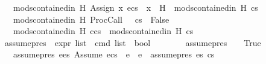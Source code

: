 \begin{isabellebody}
\ \ {\isacharbar}{\kern0pt}\ {\isachardoublequoteopen}mods{\isacharunderscore}{\kern0pt}contained{\isacharunderscore}{\kern0pt}in\ H\ {\isacharparenleft}{\kern0pt}{\isacharparenleft}{\kern0pt}Assign\ x\ e{\isacharparenright}{\kern0pt}{\isacharhash}{\kern0pt}cs{\isacharparenright}{\kern0pt}\ {\isacharequal}{\kern0pt}\ {\isacharparenleft}{\kern0pt}{\isacharparenleft}{\kern0pt}x\ {\isasymin}\ H{\isacharparenright}{\kern0pt}\ {\isasymand}\ mods{\isacharunderscore}{\kern0pt}contained{\isacharunderscore}{\kern0pt}in\ H\ cs{\isacharparenright}{\kern0pt}{\isachardoublequoteclose}\isanewline
\isanewline
\ \ {\isacharbar}{\kern0pt}\ {\isachardoublequoteopen}mods{\isacharunderscore}{\kern0pt}contained{\isacharunderscore}{\kern0pt}in\ H\ {\isacharparenleft}{\kern0pt}{\isacharparenleft}{\kern0pt}ProcCall\ {\isacharunderscore}{\kern0pt}\ {\isacharunderscore}{\kern0pt}\ {\isacharunderscore}{\kern0pt}{\isacharparenright}{\kern0pt}{\isacharhash}{\kern0pt}cs{\isacharparenright}{\kern0pt}\ {\isacharequal}{\kern0pt}\ False{\isachardoublequoteclose}\isanewline
\ \ {\isacharbar}{\kern0pt}\ {\isachardoublequoteopen}mods{\isacharunderscore}{\kern0pt}contained{\isacharunderscore}{\kern0pt}in\ H\ {\isacharparenleft}{\kern0pt}c{\isacharhash}{\kern0pt}cs{\isacharparenright}{\kern0pt}\ {\isacharequal}{\kern0pt}\ mods{\isacharunderscore}{\kern0pt}contained{\isacharunderscore}{\kern0pt}in\ H\ cs{\isachardoublequoteclose}\isanewline
\isanewline
{}\isamarkupfalse%
\ assume{\isacharunderscore}{\kern0pt}pres\ {\isacharcolon}{\kern0pt}{\isacharcolon}{\kern0pt}\ {\isachardoublequoteopen}expr\ list\ {\isasymRightarrow}\ cmd\ list\ {\isasymRightarrow}\ bool{\isachardoublequoteclose}\isanewline
\ \ \ \isanewline
\ \ \ \ {\isachardoublequoteopen}assume{\isacharunderscore}{\kern0pt}pres\ {\isacharbrackleft}{\kern0pt}{\isacharbrackright}{\kern0pt}\ {\isacharbrackleft}{\kern0pt}{\isacharbrackright}{\kern0pt}\ {\isacharequal}{\kern0pt}\ True{\isachardoublequoteclose}\isanewline
\ \ {\isacharbar}{\kern0pt}\ {\isachardoublequoteopen}assume{\isacharunderscore}{\kern0pt}pres\ {\isacharparenleft}{\kern0pt}e{}{\isacharhash}{\kern0pt}es{\isacharparenright}{\kern0pt}\ {\isacharparenleft}{\kern0pt}{\isacharparenleft}{\kern0pt}Assume\ e{}{\isacharparenright}{\kern0pt}{\isacharhash}{\kern0pt}cs{\isacharparenright}{\kern0pt}\ {\isacharequal}{\kern0pt}\ {\isacharparenleft}{\kern0pt}{\isacharparenleft}{\kern0pt}e{}\ {\isacharequal}{\kern0pt}\ e{}{\isacharparenright}{\kern0pt}\ {\isasymand}\ assume{\isacharunderscore}{\kern0pt}pres\ es\ cs{\isacharparenright}{\kern0pt}{\isachardoublequoteclose}\isanewline

\end{isabellebody}
